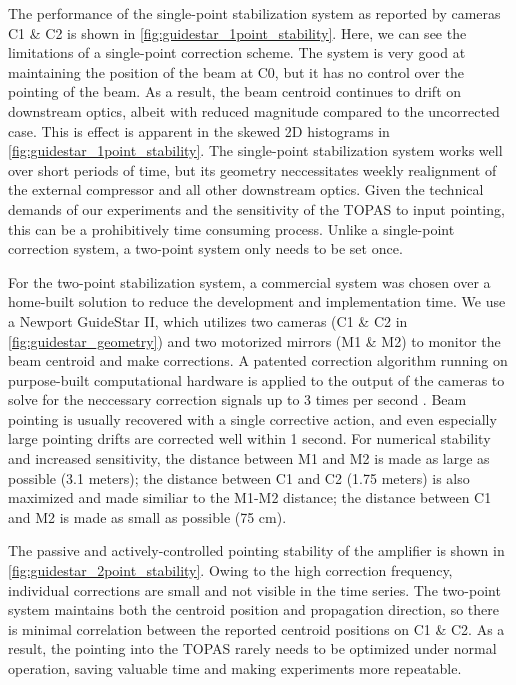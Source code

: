 The performance of the single-point stabilization system as reported by cameras C1 \& C2 is shown in \cref{fig:guidestar_1point_stability}. Here, we can see the limitations of a single-point correction scheme. The system is very good at maintaining the position of the beam at C0, but it has no control over the pointing of the beam. As a result, the beam centroid continues to drift on downstream optics, albeit with reduced magnitude compared to the uncorrected case. This is effect is apparent in the skewed 2D histograms in \cref{fig:guidestar_1point_stability}. The single-point stabilization system works well over short periods of time, but its geometry neccessitates weekly realignment of the external compressor and all other downstream optics. Given the technical demands of our experiments and the sensitivity of the TOPAS to input pointing, this can be a prohibitively time consuming process. Unlike a single-point correction system, a two-point system only needs to be set once.

For the two-point stabilization system, a commercial system was chosen over a home-built solution to reduce the development and implementation time. We use a Newport GuideStar II, which utilizes two cameras (C1 \& C2 in \cref{fig:guidestar_geometry}) and two motorized mirrors (M1 \& M2) to monitor the beam centroid and make corrections. A patented correction algorithm running on purpose-built computational hardware is applied to the output of the cameras to solve for the neccessary correction signals up to 3 times per second \cite{farinasOpticalBeamSteering2009}. Beam pointing is usually recovered with a single corrective action, and even especially large pointing drifts are corrected well within 1 second. For numerical stability and increased sensitivity, the distance between M1 and M2 is made as large as possible (3.1 meters); the distance between C1 and C2 (1.75 meters) is also maximized and made similiar to the M1-M2 distance; the distance between C1 and M2 is made as small as possible (75 cm).

The passive and actively-controlled pointing stability of the amplifier is shown in \cref{fig:guidestar_2point_stability}. Owing to the high correction frequency, individual corrections are small and not visible in the time series. The two-point system maintains both the centroid position and propagation direction, so there is minimal correlation between the reported centroid positions on C1 \& C2. As a result, the pointing into the TOPAS rarely needs to be optimized under normal operation, saving valuable time and making experiments more repeatable.


